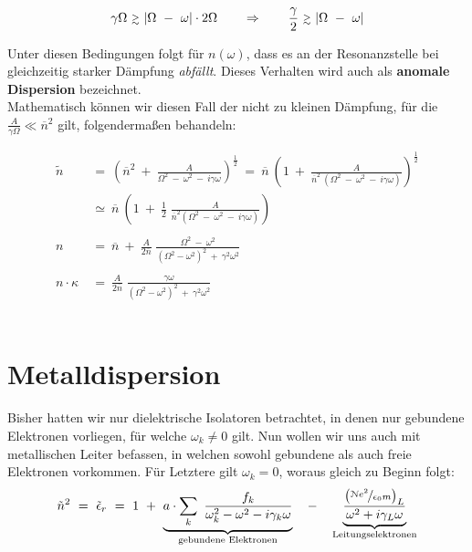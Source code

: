 \begin{equation*}
\gamma\Omega \ \mathsmaller{\mathsmaller{\gtrsim}} \ |\Omega \ - \ \omega| \cdot 2\Omega \qquad \Rightarrow \qquad \frac{\gamma}{2} \ \mathsmaller{\mathsmaller{\gtrsim}} \ |\Omega \ - \ \omega|
\end{equation*}

Unter diesen Bedingungen folgt für $n(\omega)$, dass es an der Resonanzstelle bei gleichzeitig starker Dämpfung \emph{abfällt}. Dieses Verhalten wird auch als \textbf{anomale Dispersion} bezeichnet.\\
Mathematisch können wir diesen Fall der nicht zu kleinen Dämpfung, für die $\frac{A}{\gamma\Omega}\ll \overline{n}^2$ gilt, folgendermaßen behandeln:

\begin{align*}
\tilde{n} \ &= \ \left(\overline{n}^2 \ + \ \frac{A}{\Omega^2 \ - \ \omega^2 \ - \ i \gamma\omega}\right)^{\frac{1}{2}}  \ = \  \overline{n} \  \left( 1 \ + \ \frac{A}{\overline{n}^2 \ \left(\Omega^2 \ - \ \omega^2 \ - \ i \gamma \omega\right)}\right)^{\frac{1}{2}}\\
&\simeq \ \overline{n} \ \left(1 \ + \ \frac{1}{2}\;\frac{A}{\overline{n}^2\left(\Omega^2 \ - \ \omega^2 \ - \ i \gamma\omega\right)}\right)\\
\ \\
n  \ &= \ \overline{n} \ + \ \frac{A}{2\overline{n}} \; \frac{\Omega^2 \ - \ \omega^2}{\left(\Omega^2-\omega^2\right)^2 \ + \ \gamma^2\omega^2}\\
\ \\
n \cdot \kappa  \ &= \ \frac{A}{2\overline{n}} \; \frac{\gamma\omega}{\left(\Omega^2-\omega^2\right)^2 \ + \ \gamma^2\omega^2} 
\end{align*}
\ \\

\section{Metalldispersion}

Bisher hatten wir nur dielektrische Isolatoren betrachtet, in denen nur gebundene Elektronen vorliegen, für welche $\omega_k \neq 0$ gilt. Nun wollen wir uns auch mit metallischen Leiter befassen, in welchen sowohl gebundene als auch freie Elektronen vorkommen. Für Letztere gilt $\omega_k = 0$, woraus gleich zu Beginn folgt:\\

\begin{equation*}
\tilde{n}^2  \ = \ \tilde{\epsilon}_r  \ = \ 1 \ + \ \underbrace{a\cdot\sum_k \ \frac{f_k}{\omega_k^2 - \omega^2 - i \gamma_k\omega}}_{\text{gebundene Elektronen}} \quad - \quad \underbrace{\frac{\left(\nicefrac{\mathcal{N}e^2}{\epsilon_0m}\right)_L}{\omega^2 + i\gamma_L\omega}}_{\text{Leitungselektronen}}
\end{equation*}

